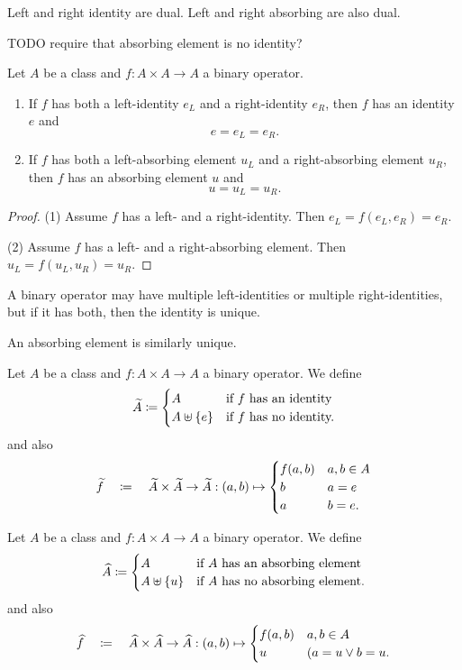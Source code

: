 Left and right identity are dual. Left and right absorbing are also dual.

TODO require that absorbing element is no identity?

\begin{lemma} \label{leftRightIdentity}
Let $A$ be a class and $f: A\times A \to A$ a binary operator.
\begin{enumerate}
\item If $f$ has both a left-identity $e_L$ and a right-identity $e_R$, then $f$ has an identity $e$ and
\[ e = e_L = e_R. \]
\item If $f$ has both a left-absorbing element $u_L$ and a right-absorbing element $u_R$, then $f$ has an absorbing element $u$ and
\[ u = u_L = u_R. \]
\end{enumerate}
\end{lemma}
\begin{proof}
(1) Assume $f$ has a left- and a right-identity. Then $e_L = f(e_L, e_R) = e_R$.

(2) Assume $f$ has a left- and a right-absorbing element. Then $u_L = f(u_L, u_R) = u_R$.
\end{proof}
\begin{corollary}
A binary operator may have multiple left-identities or multiple right-identities, but if it has both, then the identity is unique.

An absorbing element is similarly unique.
\end{corollary}

\begin{definition}
Let $A$ be a class and $f: A\times A \to A$ a binary operator. We define
\[ \widetilde{A} \coloneqq \begin{cases}
A & \text{if $f$ has an identity} \\
A\uplus \{e\} & \text{if $f$ has no identity.}
\end{cases} \]
and also
\[ \widetilde{f} \quad\coloneqq\quad \widetilde{A}\times \widetilde{A}\to \widetilde{A}: (a,b) \mapsto \begin{cases}
f(a, b) & a,b\in A \\
b & a = e \\
a & b = e.
\end{cases} \]
\end{definition}

\begin{definition}
Let $A$ be a class and $f: A\times A \to A$ a binary operator. We define
\[ \widehat{A} \coloneqq \begin{cases}
A & \text{if $A$ has an absorbing element} \\
A\uplus \{u\} & \text{if $A$ has no absorbing element.}
\end{cases} \]
and also
\[ \widehat{f} \quad\coloneqq\quad \widehat{A}\times \widehat{A}\to \widehat{A}: (a,b) \mapsto \begin{cases}
f(a, b) & a,b\in A \\
u & (a = u \lor b = u.
\end{cases} \]
\end{definition}

